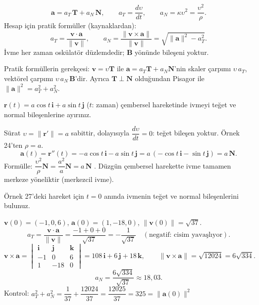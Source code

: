 \begin{teorem}
\[ \mathbf a=a_T\,\mathbf T+a_N\,\mathbf N,\qquad a_T=\frac{d\upsilon}{dt},\qquad a_N=\kappa\upsilon^2=\frac{\upsilon^2}{\rho} . \]
Hesap için pratik formüller (kaynaklardan):
\[ a_T=\frac{\mathbf v\cdot\mathbf a}{\|\mathbf v\|},\qquad a_N=\frac{\|\mathbf v\times\mathbf a\|}{\|\mathbf v\|}=\sqrt{\|\mathbf a\|^2-a_T^2} . \]
İvme her zaman oskülatör düzlemdedir; $\mathbf B$ yönünde bileşeni yoktur.
\end{teorem}

Pratik formüllerin gerekçesi: $\mathbf v=\upsilon\mathbf T$ ile $\mathbf a=a_T\mathbf T+a_N\mathbf N$'nin skaler çarpımı
$\upsilon\,a_T$, vektörel çarpımı $\upsilon\,a_N\,\mathbf B$'dir. Ayrıca $\mathbf T\perp\mathbf N$ olduğundan Pisagor ile
$\|\mathbf a\|^2=a_T^2+a_N^2$.

\begin{soru}
$\mathbf r(t)=a\cos t\,\mathbf i+a\sin t\,\mathbf j$ ($t$: zaman) çembersel hareketinde ivmeyi teğet ve normal bileşenlerine ayırınız.
\end{soru}
\begin{cevap}
Sürat $\upsilon=\|\mathbf r'\|=a$ sabittir, dolayısıyla $\dfrac{d\upsilon}{dt}=0$: teğet bileşen yoktur. Örnek 24'ten $\rho=a$.
\[ \mathbf a(t)=\mathbf r''(t)=-a\cos t\,\mathbf i-a\sin t\,\mathbf j=a\,(-\cos t\,\mathbf i-\sin t\,\mathbf j)=a\,\mathbf N . \]
Formülle: $\dfrac{\upsilon^2}{\rho}\mathbf N=\dfrac{a^2}{a}\mathbf N=a\,\mathbf N$ \checkmark. Düzgün çembersel harekette ivme tamamen
merkeze yöneliktir (merkezcil ivme).
\end{cevap}

\begin{soru}
Örnek 27'deki hareket için $t=0$ anında ivmenin teğet ve normal bileşenlerini bulunuz.
\end{soru}
\begin{cevap}
$\mathbf v(0)=(-1,0,6)$, $\mathbf a(0)=(1,-18,0)$, $\|\mathbf v(0)\|=\sqrt{37}$.
\[ a_T=\frac{\mathbf v\cdot\mathbf a}{\|\mathbf v\|}=\frac{-1+0+0}{\sqrt{37}}=-\frac{1}{\sqrt{37}} \quad(\text{negatif: cisim yavaşlıyor}). \]
\[ \mathbf v\times\mathbf a=\begin{vmatrix}\mathbf i&\mathbf j&\mathbf k\\-1&0&6\\1&-18&0\end{vmatrix}=108\,\mathbf i+6\,\mathbf j+18\,\mathbf k,\qquad
\|\mathbf v\times\mathbf a\|=\sqrt{12024}=6\sqrt{334} . \]
\[ a_N=\frac{6\sqrt{334}}{\sqrt{37}}\approx18{,}03 . \]
Kontrol: $a_T^2+a_N^2=\dfrac{1}{37}+\dfrac{12024}{37}=\dfrac{12025}{37}=325=\|\mathbf a(0)\|^2$ \checkmark
\end{cevap}

